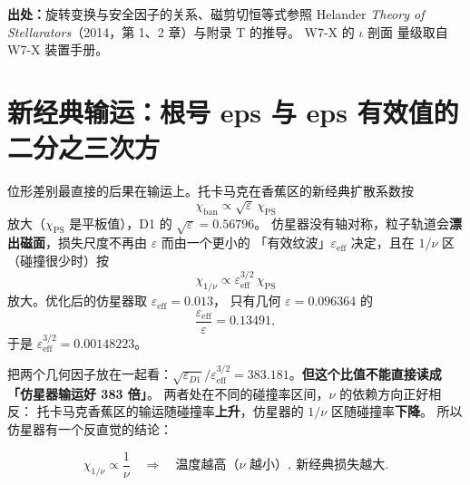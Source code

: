 {\footnotesize
\textbf{出处：}旋转变换与安全因子的关系、磁剪切恒等式参照 Helander
\emph{Theory of Stellarators}（2014，第 1、2 章）与附录 T 的推导。
W7-X 的 $\iota$ 剖面
量级取自 W7-X 装置手册。
}

\section{新经典输运：根号 eps 与 eps 有效值的二分之三次方}
\label{sec:app-aa-transport}

位形差别最直接的后果在输运上。托卡马克在香蕉区的新经典扩散系数按
\begin{equation}
\chi_{\mathrm{ban}} \propto \sqrt{\varepsilon}\,\chi_{\mathrm{PS}}
\label{eq:app-aa-sqeps}
\end{equation}
放大（$\chi_{\mathrm{PS}}$ 是平板值），D1 的 $\sqrt{\varepsilon} = 0.56796$。
仿星器没有轴对称，粒子轨道会\textbf{漂出磁面}，损失尺度不再由 $\varepsilon$ 而由一个更小的
「有效纹波」$\varepsilon_{\mathrm{eff}}$ 决定，且在 $1/\nu$ 区（碰撞很少时）按
\begin{equation}
\chi_{1/\nu} \propto \varepsilon_{\mathrm{eff}}^{3/2}\,\chi_{\mathrm{PS}}
\label{eq:app-aa-eff32}
\end{equation}
放大。优化后的仿星器取 $\varepsilon_{\mathrm{eff}} = 0.013$，
只有几何 $\varepsilon = 0.096364$ 的
\begin{equation}
\frac{\varepsilon_{\mathrm{eff}}}{\varepsilon} = 0.13491,
\label{eq:app-aa-effratio}
\end{equation}
于是 $\varepsilon_{\mathrm{eff}}^{3/2} = 0.00148223$。

把两个几何因子放在一起看：$\sqrt{\varepsilon_{D1}}/\varepsilon_{\mathrm{eff}}^{3/2}
= 383.181$。\textbf{但这个比值不能直接读成「仿星器输运好 383 倍」}。
两者处在不同的碰撞率区间，$\nu$ 的依赖方向正好相反：
托卡马克香蕉区的输运随碰撞率\textbf{上升}，仿星器的 $1/\nu$ 区随碰撞率\textbf{下降}。
所以仿星器有一个反直觉的结论：

\begin{equation}
\chi_{1/\nu} \propto \frac{1}{\nu}
\quad\Longrightarrow\quad
\text{温度越高（}\nu\text{ 越小）},\ \text{新经典损失越大}.
\label{eq:app-aa-1nu}
\end{equation}

